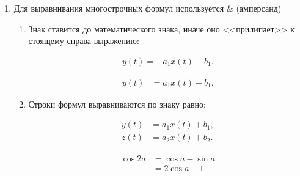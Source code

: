 \documentclass[12pt, a4paper]{article}
\begin{document}
\begin{enumerate}
	\item Для выравнивания многострочных формул используется \& (амперсанд)
	\begin{enumerate}
		\item Знак ставится до математического знака, иначе оно <<прилипает>> к стоящему справа выражению:
\begin{wrongexample}
\begin{align}
	y(t) = & a_1 x(t) + b_1.
\end{align}
\end{wrongexample}
\begin{example}
\begin{align}
	y(t) & = a_1 x(t) + b_1.
\end{align}
\end{example}	

		
		\item Строки формул выравниваются по знаку равно:
\begin{example}
\begin{align}
	y(t) & = a_1 x(t) + b_1,
	\\
	z(t) & = a_2 x(t) + b_2.
\end{align}
\end{example}
\begin{example}
\begin{align}
	\cos 2a & = \cos a - \sin a
		\nonumber \\
		& = 2\cos a - 1
\end{align}
\end{example}
			

\end{enumerate}
\end{enumerate}
\end{document}
